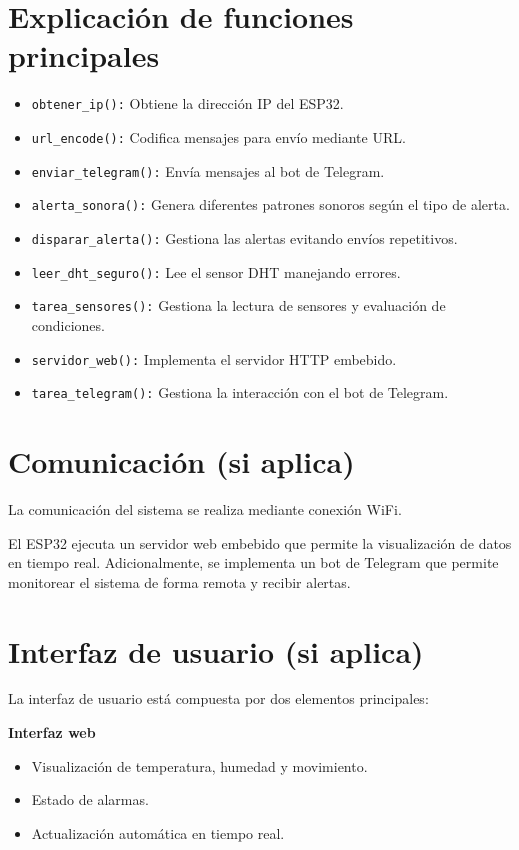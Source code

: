 \documentclass[12pt]{article}
\begin{document}
\section{Explicación de funciones principales}

\begin{itemize}
    \item \texttt{obtener\_ip():} Obtiene la dirección IP del ESP32.
    \item \texttt{url\_encode():} Codifica mensajes para envío mediante URL.
    \item \texttt{enviar\_telegram():} Envía mensajes al bot de Telegram.
    \item \texttt{alerta\_sonora():} Genera diferentes patrones sonoros según el tipo de alerta.
    \item \texttt{disparar\_alerta():} Gestiona las alertas evitando envíos repetitivos.
    \item \texttt{leer\_dht\_seguro():} Lee el sensor DHT manejando errores.
    \item \texttt{tarea\_sensores():} Gestiona la lectura de sensores y evaluación de condiciones.
    \item \texttt{servidor\_web():} Implementa el servidor HTTP embebido.
    \item \texttt{tarea\_telegram():} Gestiona la interacción con el bot de Telegram.
\end{itemize}

\section{Comunicación (si aplica)}
La comunicación del sistema se realiza mediante conexión WiFi.

El ESP32 ejecuta un servidor web embebido que permite la visualización de datos en tiempo real. Adicionalmente, se implementa un bot de Telegram que permite monitorear el sistema de forma remota y recibir alertas.

\section{Interfaz de usuario (si aplica)}
La interfaz de usuario está compuesta por dos elementos principales:

\textbf{Interfaz web}
\begin{itemize}
    \item Visualización de temperatura, humedad y movimiento.
    \item Estado de alarmas.
    \item Actualización automática en tiempo real.
\end{itemize}
\end{document}
